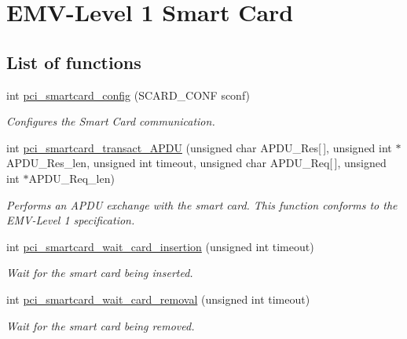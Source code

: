 \hypertarget{group__pcibx__sc}{}\section{E\+M\+V-\/\+Level 1 Smart Card}
\label{group__pcibx__sc}
\subsection*{List of functions}
\begin{DoxyCompactItemize}
\item
int \hyperlink{group__pcibx__sc_gac227636b4a270677ea489d54bfa9262e}{pci\+\_\+smartcard\+\_\+config} (S\+C\+A\+R\+D\+\_\+\+C\+O\+NF sconf)
\begin{DoxyCompactList}\small\item\em Configures the Smart Card communication. \end{DoxyCompactList}\item
int \hyperlink{group__pcibx__sc_gaa97512bc1e0389c8528b90e2d2d05ad0}{pci\+\_\+smartcard\+\_\+transact\+\_\+\+A\+P\+DU} (unsigned char A\+P\+D\+U\+\_\+\+Res\mbox{[}$\, $\mbox{]}, unsigned int $\ast$A\+P\+D\+U\+\_\+\+Res\+\_\+len, unsigned int timeout, unsigned char A\+P\+D\+U\+\_\+\+Req\mbox{[}$\, $\mbox{]}, unsigned int $\ast$A\+P\+D\+U\+\_\+\+Req\+\_\+len)
\begin{DoxyCompactList}\small\item\em Performs an A\+P\+DU exchange with the smart card. This function conforms to the E\+M\+V-\/\+Level 1 specification. \end{DoxyCompactList}\item
int \hyperlink{group__pcibx__sc_gad022b65b3032486431f926be08dc58ba}{pci\+\_\+smartcard\+\_\+wait\+\_\+card\+\_\+insertion} (unsigned int timeout)
\begin{DoxyCompactList}\small\item\em Wait for the smart card being inserted. \end{DoxyCompactList}\item
int \hyperlink{group__pcibx__sc_gab0d9d214315edba6757eb7a56508e7fb}{pci\+\_\+smartcard\+\_\+wait\+\_\+card\+\_\+removal} (unsigned int timeout)
\begin{DoxyCompactList}\small\item\em Wait for the smart card being removed. \end{DoxyCompactList}\end{DoxyCompactItemize}


